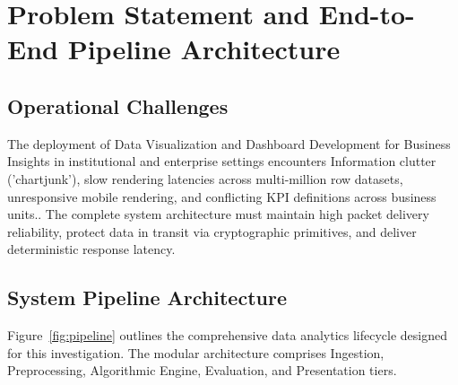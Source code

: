 \section{Problem Statement and End-to-End Pipeline Architecture}

\subsection{Operational Challenges}
The deployment of Data Visualization and Dashboard Development for Business Insights in institutional and enterprise settings encounters Information clutter ('chartjunk'), slow rendering latencies across multi-million row datasets, unresponsive mobile rendering, and conflicting KPI definitions across business units.. The complete system architecture must maintain high packet delivery reliability, protect data in transit via cryptographic primitives, and deliver deterministic response latency.

\subsection{System Pipeline Architecture}
Figure~\ref{fig:pipeline} outlines the comprehensive data analytics lifecycle designed for this investigation. The modular architecture comprises Ingestion, Preprocessing, Algorithmic Engine, Evaluation, and Presentation tiers.

